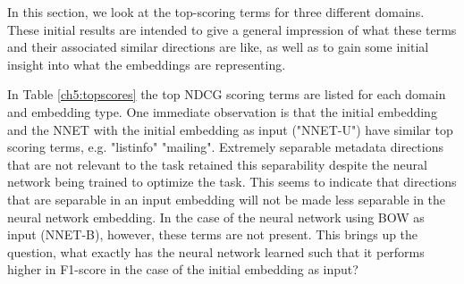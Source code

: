 In this section, we look at the top-scoring terms for three different domains. These initial results are intended to give a general impression of what these terms and their associated similar directions are like, as well as to gain some initial insight into what the embeddings are representing.

In Table \ref{ch5:topscores} the top NDCG scoring terms are listed for each domain and embedding type. One immediate observation is that the initial embedding and the NNET with the initial embedding as input ("NNET-U") have similar top scoring terms, e.g. "listinfo" "mailing". Extremely separable metadata directions that are not relevant to the task retained this separability despite the neural network being trained to optimize the task. This seems to indicate that directions that are separable in an input embedding will not be made less separable in the neural network embedding. In the case of the neural network using BOW as input (NNET-B), however, these  terms are not present. This brings up the question, what exactly has the neural network learned such that it performs higher in F1-score in the case of the initial embedding as input? 


